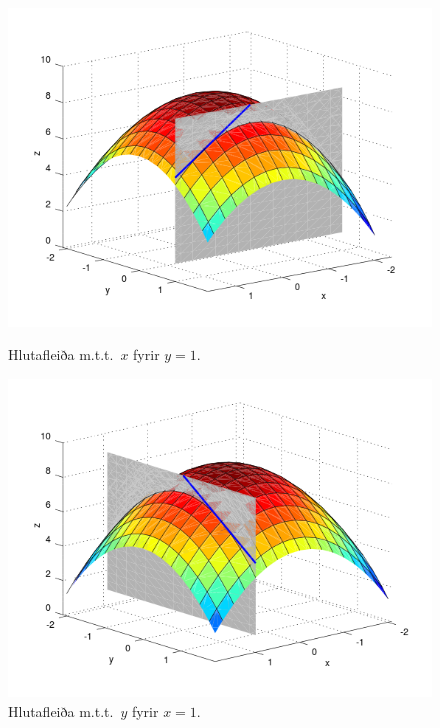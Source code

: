  \begin{figure}[!h]
        \centering
        \begin{minipage}{\textwidth}
            \centering
            \includegraphics[width=1\linewidth]{xpart.png}
            \caption*{Hlutafleiða m.t.t.~$x$ fyrir $y=1$.}
        \end{minipage}%
        \begin{minipage}{\textwidth}
            \centering
            \includegraphics[width=1\linewidth]{ypart.png}
            \caption*{Hlutafleiða m.t.t.~$y$ fyrir $x=1$.}
        \end{minipage}
   \end{figure}
 


